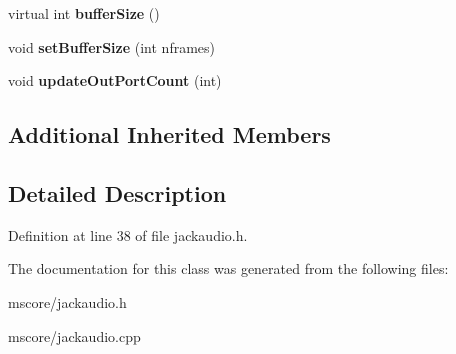 \begin{DoxyCompactItemize}
\item 
\mbox{\label{class_ms_1_1_jack_audio_a69d43a9cb19fd38f920622cac0b7c36b}} 
virtual int {\bfseries buffer\+Size} ()
\item 
\mbox{\label{class_ms_1_1_jack_audio_a6d07b41bdc8c16813323a1a425b0fe85}} 
void {\bfseries set\+Buffer\+Size} (int nframes)
\item 
\mbox{\label{class_ms_1_1_jack_audio_adb5b662e1c01562c9766ee0d2744116c}} 
void {\bfseries update\+Out\+Port\+Count} (int)
\end{DoxyCompactItemize}
\subsection*{Additional Inherited Members}


\subsection{Detailed Description}


Definition at line 38 of file jackaudio.\+h.



The documentation for this class was generated from the following files\+:\begin{DoxyCompactItemize}
\item 
mscore/jackaudio.\+h\item 
mscore/jackaudio.\+cpp\end{DoxyCompactItemize}
